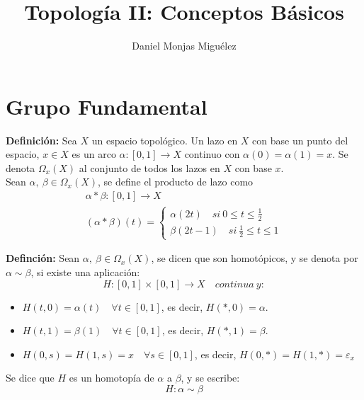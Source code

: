 \documentclass{article}
\author{Daniel Monjas Miguélez}
\title{Topología II: Conceptos Básicos}
\begin{document}
\maketitle
\newpage
\tableofcontents
\newpage

\section{Grupo Fundamental}
\textbf{Definición:} Sea $X$ un espacio topológico. Un lazo en $X$ con base un punto del espacio, $x\in X$ es un arco $\alpha:[0,1]\rightarrow X$ continuo con $\alpha(0)=\alpha(1)=x$. Se denota $\Omega_{x}(X)$ al conjunto de todos los lazos en $X$ con base $x$. \\

Sean $\alpha,\:\beta\in \Omega_{x}(X)$, se define el producto de lazo como
\begin{gather*}
\alpha*\beta:[0,1]\rightarrow X \\
(\alpha*\beta)(t)=\left\lbrace \begin{array}{c}
\alpha(2t)\quad si\:0\leq t\leq \frac{1}{2} \\
\beta(2t-1)\quad si\:\frac{1}{2}\leq t\leq 1
\end{array} \right.
\end{gather*}

\textbf{Definción:} Sean $\alpha,\:\beta\in \Omega_x(X)$, se dicen que son homotópicos, y se denota por $\alpha\sim \beta$, si existe una aplicación:
\begin{equation*}
H:[0,1]\times[0,1]\rightarrow X\quad continua\:y:
\end{equation*}

\begin{itemize}
\item $H(t,0)=\alpha(t)\quad \forall t\in [0,1]$, es decir, $H(*,0)=\alpha$.

\item $H(t,1)=\beta(1)\quad \forall t\in [0,1]$, es decir, $H(*,1)=\beta$.

\item $H(0,s)=H(1,s)=x\quad \forall s\in [0,1]$, es decir, $H(0,*)=H(1,*)=\varepsilon_x$
\end{itemize}

Se dice que $H$ es un homotopía de $\alpha$ a $\beta$, y se escribe:
\begin{equation*}
H:\alpha\sim \beta
\end{equation*}
\end{document}

